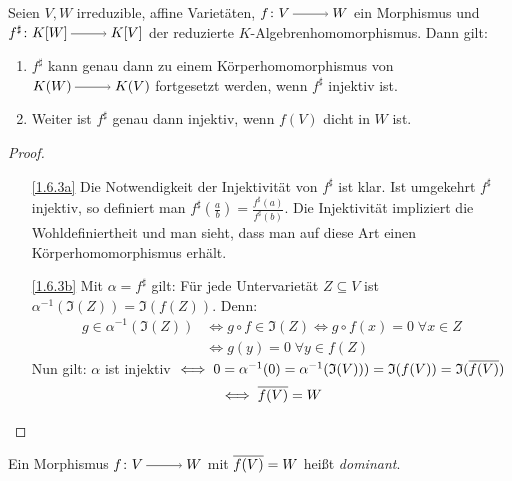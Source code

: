 \documentclass[a4paper,12pt]{scrbook}
\theoremstyle{keinenummern} %
\theoremstyle{mitnummern}
\theoremstyle{unserbeweis}
\newtheorem{proof}{Beweis}
\def\I{\mathfrak{I}}
\newcommand{\ra}{\raisebox{-1pt}{\tikz{\draw[thin,shorten >=3pt, ->] (0,0) node{\hspace*{-2pt}} -- node{} (1,0);}}\penalty1000\relax}
\def\Bar#1{\ensuremath\overline{#1}}
\begin{document}
\begin{prop}\label{1.6.3}
Seien $V,W$ irreduzible, affine Varietäten, $f \colon V\ra W$ ein Morphismus und $f^{\sharp} \colon K[W]\ra K[V]$ der reduzierte $K$-Algebrenhomomorphismus. Dann gilt:
  \begin{enumerate}
  \item{} $f^{\sharp}$ kann genau dann zu einem Körperhomomorphismus von $K(W)\ra K(V)$ fortgesetzt werden, wenn $f^{\sharp}$ injektiv ist.
  \item{} Weiter ist $f^{\sharp}$ genau dann injektiv, wenn $f(V)$ dicht in $W$ ist.
  \end{enumerate}
\end{prop}

\begin{proof}
  \begin{enumerate}
  \item[\ref{1.6.3a}] Die Notwendigkeit der Injektivität von $f^{\sharp}$ ist klar. Ist umgekehrt $f^{\sharp}$ injektiv, so definiert man $f^{\sharp}(\frac{a}{b})=\frac{f^{\sharp}(a)}{f^{\sharp}(b)}$. Die Injektivität impliziert die Wohldefiniertheit und man sieht, dass man auf diese Art einen     Körperhomomorphismus erhält.
  \item[\ref{1.6.3b}]  Mit $\alpha=f^{\sharp}$ gilt: Für jede Untervarietät $Z \subseteq V$ ist $\alpha^{-1}(\I(Z))=\I(f(Z))$. Denn:
\begin{align*}g \in \alpha^{-1}(\I(Z))& \iff g\circ f \in \I(Z) \iff g \circ f(x)=0 \;\forall x \in Z\\
& \iff g(y)=0 \;\forall y \in f(Z)\end{align*}
Nun gilt: $\alpha$ ist injektiv $\iff 0=\alpha^{-1}(0)=\alpha^{-1}(\I(V)))=\I(f(V))=\I(\Bar{f(V)})$
\[ \iff \Bar{f(V)}=W\]  
  \end{enumerate}
\end{proof}

\begin{dfn}\label{1.6.4}
Ein Morphismus $f \colon V\ra W$ mit $\Bar{f(V)}=W$ heißt \emph{dominant}.
\end{dfn}
\end{document}
